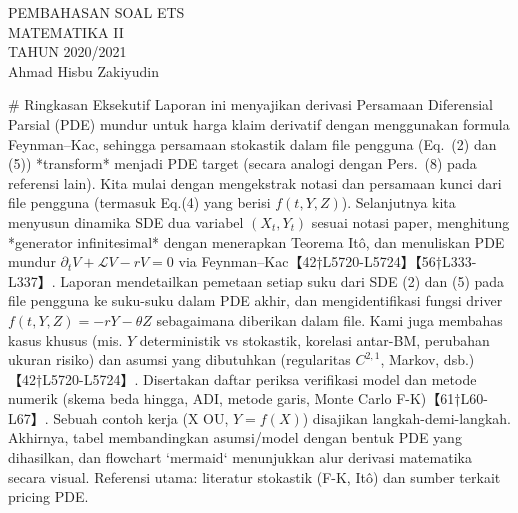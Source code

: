 \documentclass{article}
\begin{document}
 \begin{titlepage}
    \vspace*{\fill}
    \begin{center}
      \Huge {PEMBAHASAN SOAL ETS \\ MATEMATIKA II \\ TAHUN 2020/2021}\\[0.4 cm]
      \huge {Ahmad Hisbu Zakiyudin}
    \end{center}
    \vspace*{\fill}
  \end{titlepage}
\makeatletter
\renewcommand*\env@matrix[1][*\c@MaxMatrixCols c]{%
  \hskip -\arraycolsep
  \let\@ifnextchar\new@ifnextchar
  \array{#1}}
\makeatother
\newcount\arrowcount
\newcommand\arrows[1]{
        \global\arrowcount#1
        \ifnum\arrowcount>0
                \begin{matrix}[c]
                \expandafter\nextarrow
        \fi
}

\newcommand\nextarrow[1]{
        \global\advance\arrowcount-1
        \ifx\relax#1\relax\else \xrightarrow{#1}\fi
        \ifnum\arrowcount=0
                \end{matrix}
        \else
                \\
                \expandafter\nextarrow
        \fi
}
\newpage
{}
# Ringkasan Eksekutif  
Laporan ini menyajikan derivasi Persamaan Diferensial Parsial (PDE) mundur untuk harga klaim derivatif dengan menggunakan formula Feynman–Kac, sehingga persamaan stokastik dalam file pengguna (Eq. (2) dan (5)) *transform* menjadi PDE target (secara analogi dengan Pers. (8) pada referensi lain). Kita mulai dengan mengekstrak notasi dan persamaan kunci dari file pengguna (termasuk Eq.(4) yang berisi \(f(t,Y,Z)\)). Selanjutnya kita menyusun dinamika SDE dua variabel \((X_t,Y_t)\) sesuai notasi paper, menghitung *generator infinitesimal* dengan menerapkan Teorema Itô, dan menuliskan PDE mundur \(\partial_tV + \mathcal{L}V - rV = 0\) via Feynman–Kac【42†L5720-L5724】【56†L333-L337】. Laporan mendetailkan pemetaan setiap suku dari SDE (2) dan (5) pada file pengguna ke suku-suku dalam PDE akhir, dan mengidentifikasi fungsi driver \(f(t,Y,Z)=-rY-\theta Z\) sebagaimana diberikan dalam file. Kami juga membahas kasus khusus (mis. \(Y\) deterministik vs stokastik, korelasi antar-BM, perubahan ukuran risiko) dan asumsi yang dibutuhkan (regularitas \(C^{2,1}\), Markov, dsb.)【42†L5720-L5724】. Disertakan daftar periksa verifikasi model dan metode numerik (skema beda hingga, ADI, metode garis, Monte Carlo F-K)【61†L60-L67】. Sebuah contoh kerja (X OU, \(Y=f(X)\)) disajikan langkah-demi-langkah. Akhirnya, tabel membandingkan asumsi/model dengan bentuk PDE yang dihasilkan, dan flowchart `mermaid` menunjukkan alur derivasi matematika secara visual. Referensi utama: literatur stokastik (F-K, Itô) dan sumber terkait pricing PDE.
\end{document}
